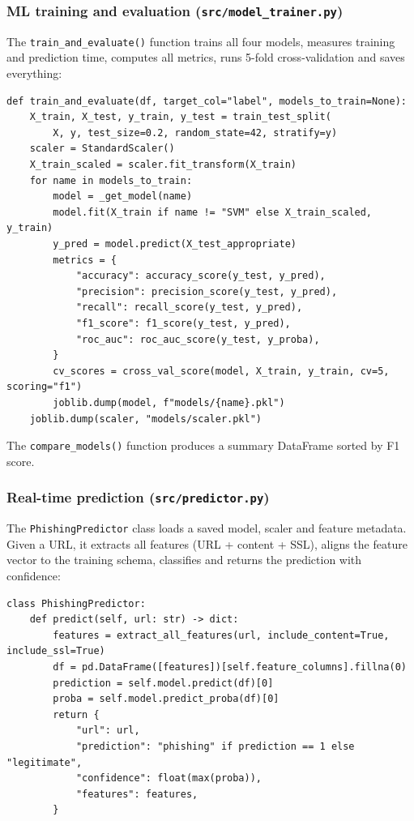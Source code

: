\documentclass[11pt,a4paper]{article}
\begin{document}
\subsubsection*{ML training and evaluation (\texttt{src/model\_trainer.py})}

The \texttt{train\_and\_evaluate()} function trains all four models, measures training and prediction time, computes all metrics, runs 5-fold cross-validation and saves everything:

\begin{lstlisting}
def train_and_evaluate(df, target_col="label", models_to_train=None):
    X_train, X_test, y_train, y_test = train_test_split(
        X, y, test_size=0.2, random_state=42, stratify=y)
    scaler = StandardScaler()
    X_train_scaled = scaler.fit_transform(X_train)
    for name in models_to_train:
        model = _get_model(name)
        model.fit(X_train if name != "SVM" else X_train_scaled, y_train)
        y_pred = model.predict(X_test_appropriate)
        metrics = {
            "accuracy": accuracy_score(y_test, y_pred),
            "precision": precision_score(y_test, y_pred),
            "recall": recall_score(y_test, y_pred),
            "f1_score": f1_score(y_test, y_pred),
            "roc_auc": roc_auc_score(y_test, y_proba),
        }
        cv_scores = cross_val_score(model, X_train, y_train, cv=5, scoring="f1")
        joblib.dump(model, f"models/{name}.pkl")
    joblib.dump(scaler, "models/scaler.pkl")
\end{lstlisting}

The \texttt{compare\_models()} function produces a summary DataFrame sorted by F1 score.

\subsubsection*{Real-time prediction (\texttt{src/predictor.py})}

The \texttt{PhishingPredictor} class loads a saved model, scaler and feature metadata. Given a URL, it extracts all features (URL + content + SSL), aligns the feature vector to the training schema, classifies and returns the prediction with confidence:

\begin{lstlisting}
class PhishingPredictor:
    def predict(self, url: str) -> dict:
        features = extract_all_features(url, include_content=True, include_ssl=True)
        df = pd.DataFrame([features])[self.feature_columns].fillna(0)
        prediction = self.model.predict(df)[0]
        proba = self.model.predict_proba(df)[0]
        return {
            "url": url,
            "prediction": "phishing" if prediction == 1 else "legitimate",
            "confidence": float(max(proba)),
            "features": features,
        }
\end{lstlisting}
\end{document}
